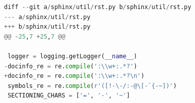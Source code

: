 \lstset{linewidth=\linewidth}
\lstset{basicstyle=\small\ttfamily}

\begin{lstlisting}[language=Python,belowskip=-0.8 \baselineskip]
diff --git a/sphinx/util/rst.py b/sphinx/util/rst.py
--- a/sphinx/util/rst.py
+++ b/sphinx/util/rst.py
@@ -25,7 +25,7 @@
 
 logger = logging.getLogger(__name__)
-docinfo_re = re.compile(':\\w+:.*?')
+docinfo_re = re.compile(':\\w+:.*?\n')
 symbols_re = re.compile(r'([!-\-/:-@\[-`{-~])')
 SECTIONING_CHARS = ['=', '-', '~']
 \end{lstlisting}